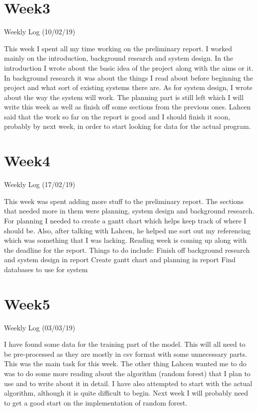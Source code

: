 \section{Week3}
Weekly Log (10/02/19)

This week I spent all my time working on the preliminary report. I worked mainly on the introduction, background research and system design. In the introduction I wrote about the basic idea of the project along with the aims or it. In background research it was about the things I read about before beginning the project and what sort of existing systems there are. As for system design, I wrote about the way the system will work. 
The planning part is still left which I will write this week as well as finish off some sections from the previous ones.
Lahcen said that the work so far on the report is good and I should finish it soon, probably by next week, in order to start looking for data for the actual program. 

\section{Week4}
Weekly Log (17/02/19)

This week was spent adding more stuff to the preliminary report. The sections that needed more in them were planning, system design and background research. 
For planning I needed to create a gantt chart which helps keep track of where I should be. 
Also, after talking with Lahcen, he helped me sort out my referencing which was something that I was lacking. 
Reading week is coming up along with the deadline for the report. Things to do include:
\newline
Finish off background research and system design in report
\newline
Create gantt chart and planning in report
\newline
Find databases to use for system

\section{Week5}
Weekly Log (03/03/19)

I have found some data for the training part of the model. This will all need to be pre-processed as they are mostly in csv format with some unnecessary parts. This was the main task for this week. The other thing Lahcen wanted me to do was to do some more reading about the algorithm (random forest) that I plan to use and to write about it in detail. 
I have also attempted to start with the actual algorithm, although it is quite difficult to begin. 
Next week I will probably need to get a good start on the implementation of random forest. 

